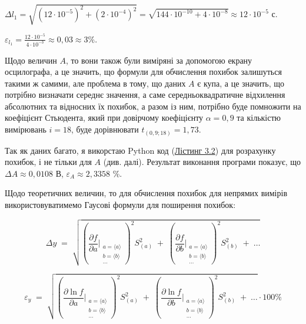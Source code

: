\documentclass[12pt,a4paper]{article}
\begin{document}
    $\displaystyle \Delta l_1 = \sqrt{\left( 12 \cdot 10^{-5}\right)^2 + \left(2 \cdot 10^{-4}\right)^2} = \sqrt{144 \cdot 10^{-10} + 4 \cdot 10^{-8}} \approx 12 \cdot 10^{-5}$ с.

    $\displaystyle \varepsilon_{l_1} = \frac{12 \cdot 10^{-5}}{4 \cdot 10^{-3}} \approx 0,03 \approx 3\%$.

    \vspace{1em} %

    Щодо величин $A$, то вони також були виміряні за допомогою екрану осцилографа, а це значить, що формули для обчислення похибок залишуться такими ж самими, але проблема в тому, що
    даних $A$ є купа, а це значить, що потрібно визначати середнє значення, а саме середньоквадратичне відхилення абсолютних та відносних їх похибок, а разом із ним, потрібно буде помножити на коефіцієнт
    Стьюдента, який при довірчому коефіцієнту $\alpha = 0,9$ та кількістю вимірювань $i = 18$, буде дорівнювати $t_{(0,9; 18)} = 1,73$.

    Так як даних багато, я викорстаю Python код (\hyperlink{listing2}{Лістинг 3.2}) для розрахунку похибок, і не тільки для $A$ (див. далі). Результат виконання програми показує, що $\Delta A \approx 0,0108$ В, $\varepsilon_{A} \approx 2,3358$ \%.

    Щодо теоретичних величин, то для обчислення похибок для непрямих вимірів використовуватимемо Гаусові формули для поширення похибок:

    \[
        \Delta y \;=\;
        \sqrt{
        \left(
            \frac{\partial f}{\partial a}\Bigg|_{\substack{a=\langle a\rangle \\ b=\langle b\rangle \\ \dots}}
        \right)^{2} S_{(a)}^{2}
        \;+\;
        \left(
            \frac{\partial f}{\partial b}\Bigg|_{\substack{a=\langle a\rangle \\ b=\langle b\rangle \\ \dots}}
        \right)^{2} S_{(b)}^{2}
        \;+\;\dots
        }
    \]

    \[
        \varepsilon_y \;=\;
        \sqrt{
        \left(
            \frac{\partial \ln f}{\partial a}\Bigg|_{\substack{a=\langle a\rangle \\ b=\langle b\rangle \\ \dots}}
        \right)^{2} S_{(a)}^{2}
        \;+\;
        \left(
            \frac{\partial \ln f}{\partial b}\Bigg|_{\substack{a=\langle a\rangle \\ b=\langle b\rangle \\ \dots}}
        \right)^{2} S_{(b)}^{2}
        \;+\;\dots
        } \cdot 100 \%
    \]
\end{document}
